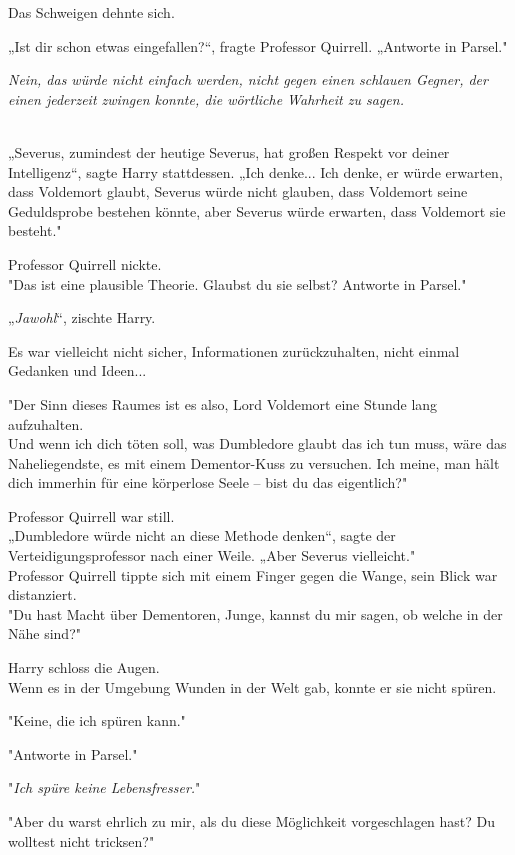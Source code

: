 {Das Schweigen dehnte sich.

„Ist dir schon etwas eingefallen?“, fragte Professor Quirrell. „Antworte in Parsel."

\emph{Nein, das würde nicht einfach werden, nicht gegen einen schlauen Gegner, der einen jederzeit zwingen konnte, die wörtliche Wahrheit zu sagen.\\ }\strut \\ „Severus, zumindest der heutige Severus, hat großen Respekt vor deiner Intelligenz“, sagte Harry stattdessen. „Ich denke... Ich denke, er würde erwarten, dass Voldemort glaubt, Severus würde nicht glauben, dass Voldemort seine Geduldsprobe bestehen könnte, aber Severus würde erwarten, dass Voldemort sie besteht."

Professor Quirrell nickte.\\ "Das ist eine plausible Theorie. Glaubst du sie selbst? Antworte in Parsel."

„\emph{Jawohl}“, zischte Harry.

Es war vielleicht nicht sicher, Informationen zurückzuhalten, nicht einmal Gedanken und Ideen...

"Der Sinn dieses Raumes ist es also, Lord Voldemort eine Stunde lang aufzuhalten.\\ Und wenn ich dich töten soll, was Dumbledore glaubt das ich tun muss, wäre das Naheliegendste, es mit einem Dementor-Kuss zu versuchen. Ich meine, man hält dich immerhin für eine körperlose Seele -- bist du das eigentlich?"

Professor Quirrell war still.\\ „Dumbledore würde nicht an diese Methode denken“, sagte der Verteidigungsprofessor nach einer Weile. „Aber Severus vielleicht."\\ Professor Quirrell tippte sich mit einem Finger gegen die Wange, sein Blick war distanziert.\\ "Du hast Macht über Dementoren, Junge, kannst du mir sagen, ob welche in der Nähe sind?"

Harry schloss die Augen.\\ Wenn es in der Umgebung Wunden in der Welt gab, konnte er sie nicht spüren.

"Keine, die ich spüren kann."

"Antworte in Parsel."

"\emph{Ich spüre keine Lebensfresser.}"

"Aber du warst ehrlich zu mir, als du diese Möglichkeit vorgeschlagen hast? Du wolltest nicht tricksen?"

}
